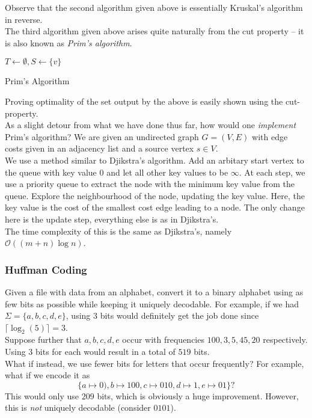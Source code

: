 Observe that the second algorithm given above is essentially Kruskal's algorithm in reverse.\\

The third algorithm given above arises quite naturally from the cut property -- it is also known as \textit{Prim's algorithm}.

\begin{algorithm}
	\DontPrintSemicolon
	\SetNoFillComment
	$T\gets\emptyset, S\gets\{v\}$ 
	\caption{Prim's Algorithm}\label{algo: prim's algorithm}
\end{algorithm}

Proving optimality of the set output by the above is easily shown using the cut-property.\\

As a slight detour from what we have done thus far, how would one \textit{implement} Prim's algorithm? We are given an undirected graph $G=(V,E)$ with edge costs given in an adjacency list and a source vertex $s\in V$.\\
We use a method similar to Djikstra's algorithm. Add an arbitary start vertex to the queue with key value $0$ and let all other key values to be $\infty$. At each step, we use a priority queue to extract the node with the minimum key value from the queue. Explore the neighbourhood of the node, updating the key value. Here, the key value is the cost of the smallest cost edge leading to a node. The only change here is the update step, everything else is as in Djikstra's.\\
The time complexity of this is the same as Djikstra's, namely $\mathcal{O}((m+n)\log n)$.

\subsubsection{Huffman Coding}

Given a file with data from an alphabet, convert it to a binary alphabet using as few bits as possible while keeping it uniquely decodable. For example, if we had $\Sigma=\{a,b,c,d,e\}$, using $3$ bits would definitely get the job done since $\lceil \log_2(5)\rceil = 3$.\\
Suppose further that $a,b,c,d,e$ occur with frequencies $100,3,5,45,20$ respectively. Using $3$ bits for each would result in a total of $519$ bits.\\
What if instead, we use fewer bits for letters that occur frequently? For example, what if we encode it as
\[ \{a\mapsto 0),b\mapsto 100,c\mapsto 010,d\mapsto 1,e\mapsto 01\}? \] This would only use $209$ bits, which is obviously a huge improvement. However, this is \textit{not} uniquely decodable (consider $0101$).


